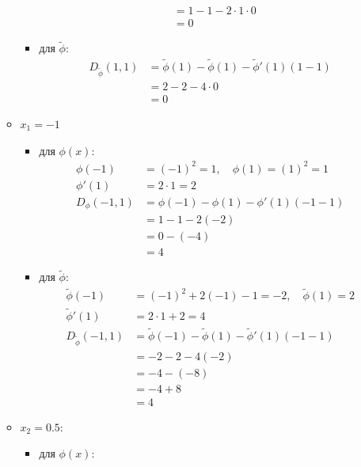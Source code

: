 \documentclass[12pt]{scrartcl}
\begin{document}
\begin{enumerate}
\begin{itemize}
\begin{itemize}
\begin{align*}
                &= 1 - 1 - 2 \cdot 1 \cdot 0 \\
                &= 0
            \end{align*}
            \item для $\tilde{\phi}$:
            \begin{align*}
                D_{\tilde{\phi}}(1, 1) &= \tilde{\phi}(1) - \tilde{\phi}(1) - \tilde{\phi}'(1)(1 - 1) \\
                &= 2 - 2 - 4 \cdot 0 \\
                &= 0
            \end{align*}
        \end{itemize}
        \item $x_{1} = -1$
        \begin{itemize}
            \item для $\phi(x)$:
            \begin{align*}
                \phi(-1) &= (-1)^2 = 1, \quad \phi(1) = (1)^2 = 1 \\
                \phi'(1) &= 2 \cdot 1 = 2 \\
                D_{\phi}(-1, 1) &= \phi(-1) - \phi(1) - \phi'(1)(-1 - 1) \\
                &= 1 - 1 - 2(-2) \\
                &= 0 - (-4) \\
                &= 4
            \end{align*}
            \item для $\tilde{\phi}$:
            \begin{align*}
                \tilde{\phi}(-1) &= (-1)^2 + 2(-1) - 1 = -2, \quad \tilde{\phi}(1) = 2 \\
                \tilde{\phi}'(1) &= 2 \cdot 1 + 2 = 4 \\
                D_{\tilde{\phi}}(-1, 1) &= \tilde{\phi}(-1) - \tilde{\phi}(1) - \tilde{\phi}'(1)(-1 - 1) \\
                &= -2 - 2 - 4(-2) \\
                &= -4 - (-8) \\
                &= -4 + 8 \\
                &= 4
            \end{align*}
        \end{itemize}
        \item $x_{2} = 0.5$:
        \begin{itemize}
            \item для $\phi(x)$:
            \begin{align*}

\end{align*}
\end{itemize}
\end{itemize}
\end{enumerate}
\end{document}
